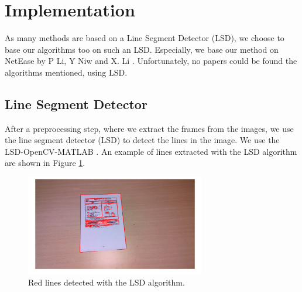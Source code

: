 \documentclass[english, paper=a4]{scrartcl}
\begin{document}
\section{Implementation}
As many methods are based on a Line Segment Detector (LSD), we choose to base our algorithms too on such an LSD. Especially, we base our method on NetEase by P Li, Y Niw and X. Li \cite{burie2015icdar2015}.
Unfortunately, no papers could be found the algorithms
mentioned, using LSD.


\subsection{Line Segment Detector}
After a preprocessing step, where we extract the frames from the images, we use the line segment detector (LSD) \cite{von2010lsd} to detect the lines in the image. We use the LSD-OpenCV-MATLAB \cite{lsd2014}. An example of lines extracted with the LSD algorithm are shown in Figure \ref{fig:lsd}.

\begin{figure}[h]
\centering
\includegraphics[width=0.7\textwidth]{lsd.png}
\caption{Red lines detected with the LSD algorithm.}
\label{fig:lsd}
\end{figure}
\end{document}
